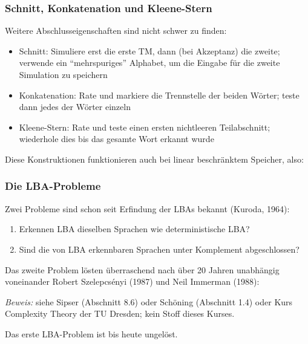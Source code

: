 \documentclass[aspectratio=1610,onlymath]{beamer}
\begin{document}
\begin{frame}\frametitle{Schnitt, Konkatenation und Kleene-Stern}

Weitere Abschlusseigenschaften sind nicht schwer zu finden:

\begin{itemize}
\item \alert{Schnitt:} Simuliere erst die erste TM, dann (bei Akzeptanz) die zweite; verwende ein "`mehrspuriges"' Alphabet, um die Eingabe für die zweite Simulation zu speichern
\item \alert{Konkatenation:} Rate und markiere die Trennstelle der beiden Wörter; teste dann jedes der Wörter einzeln
\item \alert{Kleene-Stern:} Rate und teste einen ersten nichtleeren Teilabschnitt; wiederhole dies bis das gesamte Wort erkannt wurde
\end{itemize}\pause

Diese Konstruktionen funktionieren auch bei linear beschränktem Speicher, also:\medskip


\end{frame}

\begin{frame}\frametitle{Die LBA-Probleme}

Zwei Probleme sind schon seit Erfindung der LBAs bekannt (Kuroda, 1964):
\begin{enumerate}[(1)]
\item Erkennen LBA dieselben Sprachen wie deterministische LBA?
\item Sind die von LBA erkennbaren Sprachen unter Komplement abgeschlossen?
\end{enumerate}\pause

Das zweite Problem lösten überraschend nach über 20 Jahren unabhängig voneinander Robert Szelepcsényi (1987) und Neil Immerman (1988):\medskip

\medskip

\emph{Beweis:} siehe Sipser (Abschnitt 8.6) oder Schöning (Abschnitt 1.4) oder Kurs \alert{Complexity Theory} der TU Dresden; kein Stoff dieses Kurses.
\medskip\pause

Das erste LBA-Problem ist bis heute ungelöst.

\end{frame}
\end{document}
